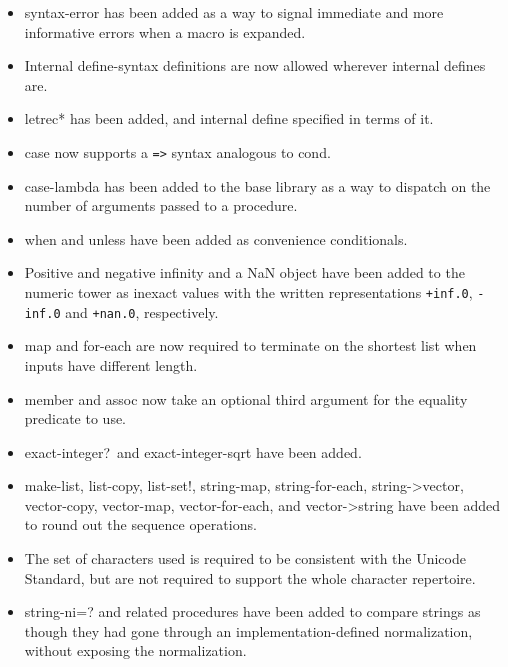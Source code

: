 \begin{itemize}
\item {\cf syntax-error} has been added as a way to signal immediate
and more informative errors when a macro is expanded.

\item Internal {\cf define-syntax} definitions are now allowed wherever
internal {\cf define}s are.

\item {\cf letrec*} has been added, and internal define specified in
terms of it.

\item {\cf case} now supports a {\tt =>} syntax analogous to {\cf cond}.

\item {\cf case-lambda} has been added to the base library as a way to
dispatch on the number of arguments passed to a procedure.

\item {\cf when} and {\cf unless} have been added as convenience
conditionals.

\item Positive and negative infinity and a NaN object have been added
to the numeric tower as inexact values with the written
representations {\tt +inf.0}, {\tt -inf.0} and {\tt +nan.0},
respectively.

\item {\cf map} and {\cf for-each} are now required to terminate on
the shortest list when inputs have different length.

\item {\cf member} and {\cf assoc} now take an optional third argument
for the equality predicate to use.

\item {\cf exact-integer?}\  and {\cf exact-integer-sqrt} have been added.

\item {\cf make-list}, {\cf list-copy}, {\cf list-set!}, {\cf
string-map}, {\cf string-for-each}, {\cf string->vector}, {\cf
vector-copy}, {\cf vector-map}, {\cf vector-for-each}, and {\cf
vector->string} have been added to round out the sequence operations.

\item The set of characters used is required to be consistent with the
Unicode Standard, 
but are not required to support the whole character repertoire.

\item {\cf string-ni=?} and related procedures have been added to
compare strings as though they had gone through an
implementation-defined normalization, without exposing the
normalization.


\end{itemize}
